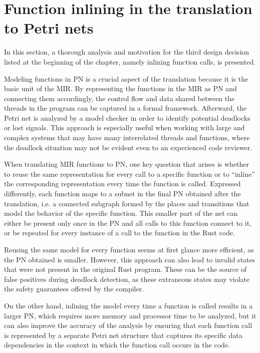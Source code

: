 \documentclass[../Thesis.tex]{subfiles}
\begin{document}
\section{Function inlining in the translation to Petri nets}

In this section, a thorough analysis and motivation for the third design decision
listed at the beginning of the chapter, namely inlining function calls, is presented.

Modeling functions in \acrshort{PN} is a crucial aspect of the translation
because it is the basic unit of the MIR.
By representing the functions in the MIR as \acrshort{PN} and connecting them accordingly,
the control flow and data shared between the threads in the program
can be captured in a formal framework.
Afterward, the Petri net is analyzed by a model checker
in order to identify potential deadlocks or lost signals.
This approach is especially useful when working with large and complex systems
that may have many interrelated threads and functions,
where the deadlock situation may not be evident even to an experienced code reviewer.

When translating MIR functions to \acrshort{PN}, one key question that arises is
whether to reuse the same representation for every call to a specific function or
to ``inline'' the corresponding representation every time the function is called.
Expressed differently, each function maps to a subnet
in the final \acrshort{PN} obtained after the translation, i.e.
a connected subgraph formed by the places and transitions
that model the behavior of the specific function.
This smaller part of the net can either be present only once in the \acrshort{PN}
and all calls to this function connect to it,
or be repeated for every instance of a call to the function in the Rust code.

Reusing the same model for every function seems at first glance more efficient,
as the \acrshort{PN} obtained is smaller.
However, this approach can also lead to invalid states
that were not present in the original Rust program.
These can be the source of false positives during deadlock detection,
as these extraneous states may violate
the safety guarantees offered by the compiler.

On the other hand, inlining the model every time a function is called results in
a larger \acrshort{PN}, which requires more memory and processor time to be analyzed,
but it can also improve the accuracy of the analysis by ensuring
that each function call is represented by a separate Petri net structure
that captures its specific data dependencies in the context
in which the function call occurs in the code.
\end{document}
